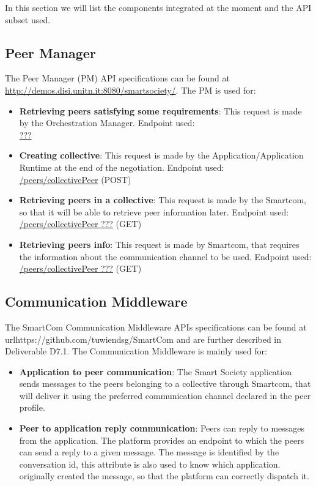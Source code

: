 In this section we will list the components integrated at the moment and the API subset used.

\subsection{Peer Manager}
The Peer Manager (PM) API specifications can be found at \url{http://demos.disi.unitn.it:8080/smartsociety/}. The PM is used for:
\begin{itemize}
\item {\bf Retrieving peers satisfying some requirements}: This request is made by the Orchestration Manager. Endpoint used:\\
	\url{???}
\item {\bf Creating collective}: This request is made by the Application/Application Runtime at the end of the negotiation. Endpoint used:\\
	\url{/peers/collectivePeer} (\textsc{POST})
\item {\bf Retrieving peers in a collective}: This request is made by the Smartcom, so that it will be able to retrieve peer information later. Endpoint used:\\
	\url{/peers/collectivePeer ???} (\textsc{GET})
\item {\bf Retrieving peers info}: This request is made by Smartcom, that requires the information about the communication channel to be used. Endpoint used:\\
	\url{/peers/collectivePeer ???} (\textsc{GET})	
\end{itemize}


\subsection{Communication Middleware}
The SmartCom Communication Middleware APIs specifications can be found at 
url{https://github.com/tuwiendsg/SmartCom} and are further described in Deliverable D7.1. The Communication Middleware is mainly used for:
\begin{itemize}
\item {\bf Application to peer communication}: The Smart Society application sends messages to the peers belonging to a collective through Smartcom, that will deliver it using the preferred communication channel declared in the peer profile.
\item {\bf Peer to application reply communication}: Peers can reply to messages from the application. The platform provides an endpoint to which the peers can send a reply to a given message. The message is identified by the conversation id, this attribute is also used to know which application.
originally created the message, so that the platform can correctly dispatch it. 
\end{itemize}


